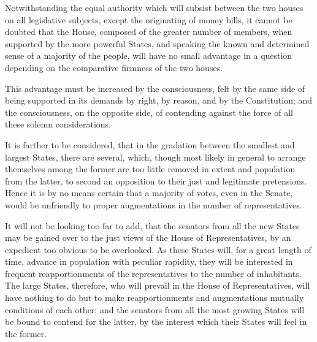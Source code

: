 Notwithstanding the equal authority which will subsist between the two houses on all legislative subjects, except the originating of money bills, it cannot be doubted that the House, composed of the greater number of members, when supported by the more powerful States, and speaking the known and determined sense of a majority of the people, will have no small advantage in a question depending on the comparative firmness of the two houses.

This advantage must be increased by the consciousness, felt by the same side of being supported in its demands by right, by reason, and by the Constitution; and the consciousness, on the opposite side, of contending against the force of all these solemn considerations.

It is farther to be considered, that in the gradation between the smallest and largest States, there are several, which, though most likely in general to arrange themselves among the former are too little removed in extent and population from the latter, to second an opposition to their just and legitimate pretensions. 
Hence it is by no means certain that a majority of votes, even in the Senate, would be unfriendly to proper augmentations in the number of representatives.

It will not be looking too far to add, that the senators from all the new States may be gained over to the just views of the House of Representatives, by an expedient too obvious to be overlooked. 
As these States will, for a great length of time, advance in population with peculiar rapidity, they will be interested in frequent reapportionments of the representatives to the number of inhabitants. 
The large States, therefore, who will prevail in the House of Representatives, will have nothing to do but to make reapportionments and augmentations mutually conditions of each other; and the senators from all the most growing States will be bound to contend for the latter, by the interest which their States will feel in the former.

